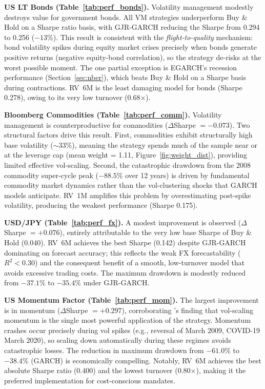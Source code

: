 \documentclass[12pt, a4paper]{article}
\begin{document}
\textbf{US LT Bonds (Table~\ref{tab:perf_bonds}).} Volatility management modestly destroys
value for government bonds. All VM strategies underperform Buy \& Hold on a Sharpe ratio
basis, with GJR-GARCH reducing the Sharpe from 0.294 to 0.256 ($-13\%$). This result is
consistent with the \emph{flight-to-quality} mechanism: bond volatility spikes during
equity market crises precisely when bonds generate positive returns (negative equity-bond
correlation), so the strategy de-risks at the worst possible moment. The one partial
exception is EGARCH's recession performance (Section~\ref{sec:nber}), which beats Buy \&
Hold on a Sharpe basis during contractions. RV~6M is the least damaging model for bonds
(Sharpe 0.278), owing to its very low turnover (0.68$\times$).

\textbf{Bloomberg Commodities (Table~\ref{tab:perf_comm}).} Volatility management is
counterproductive for commodities ($\Delta$Sharpe $= -0.073$). Two structural factors
drive this result. First, commodities exhibit structurally high base volatility
($\sim$33\%), meaning the strategy spends much of the sample near or at the leverage cap
(mean weight = 1.11, Figure~\ref{fig:weight_dist}), providing limited effective
vol-scaling. Second, the catastrophic drawdown from the 2008 commodity super-cycle peak
($-88.5\%$ over 12 years) is driven by fundamental commodity market dynamics rather than
the vol-clustering shocks that GARCH models anticipate. RV~1M amplifies this problem
by overestimating post-spike volatility, producing the weakest performance (Sharpe 0.175).

\textbf{USD/JPY (Table~\ref{tab:perf_fx}).} A modest improvement is observed
($\Delta$Sharpe $= +0.076$), entirely attributable to the very low base Sharpe of Buy \&
Hold (0.040). RV~6M achieves the best Sharpe (0.142) despite GJR-GARCH dominating on
forecast accuracy; this reflects the weak FX forecastability ($R^2 < 0.30$) and the
consequent benefit of a smooth, low-turnover model that avoids excessive trading costs.
The maximum drawdown is modestly reduced from $-37.1\%$ to $-35.4\%$ under GJR-GARCH.

\textbf{US Momentum Factor (Table~\ref{tab:perf_mom}).} The largest improvement is in
momentum ($\Delta$Sharpe $= +0.297$), corroborating \citet{Moreira2017}'s finding that
vol-scaling momentum is the single most powerful application of the strategy. Momentum
crashes occur precisely during vol spikes (e.g., reversal of March 2009, COVID-19 March
2020), so scaling down automatically during these regimes avoids catastrophic losses. The
reduction in maximum drawdown from $-61.0\%$ to $-38.4\%$ (GARCH) is economically
compelling. Notably, RV~6M achieves the best absolute Sharpe ratio (0.400) and the lowest
turnover (0.80$\times$), making it the preferred implementation for cost-conscious
mandates.
\end{document}
